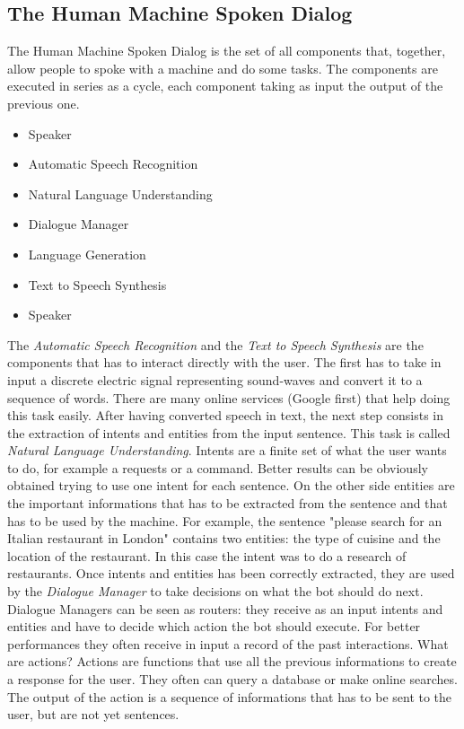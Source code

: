 \documentclass[11pt,a4paper]{article}
\begin{document}
\subsection{The Human Machine Spoken Dialog}

The Human Machine Spoken Dialog is the set of all components that, together, allow people to spoke with a machine and do some tasks. The components are executed in series as a cycle, each component taking as input the output of the previous one.
\begin{itemize}
\item Speaker
\item Automatic Speech Recognition
\item Natural Language Understanding
\item Dialogue Manager
\item Language Generation
\item Text to Speech Synthesis
\item Speaker
\end{itemize}
The \textit{Automatic Speech Recognition} and the \textit{Text to Speech Synthesis} are the components that has to interact directly with the user. The first has to take in input a discrete electric signal representing sound-waves and convert it to a sequence of words. There are many online services (Google first) that help doing this task easily.
After having converted speech in text, the next step consists in the extraction of intents and entities from the input sentence. This task is called \textit{Natural Language Understanding}. Intents are a finite set of what the user wants to do, for example a requests or a command. Better results can be obviously obtained trying to use one intent for each sentence. On the other side entities are the important informations that has to be extracted from the sentence and that has to be used by the machine. For example, the sentence "please search for an Italian restaurant in London" contains two entities: the type of cuisine and the location of the restaurant. In this case the intent was to do a research of restaurants.
Once intents and entities has been correctly extracted, they are used by the \textit{Dialogue Manager} to take decisions on what the bot should do next. Dialogue Managers can be seen as routers: they receive as an input intents and entities and have to decide which action the bot should execute. For better performances they often receive in input a record of the past interactions. What are actions? Actions are functions that use all the previous informations to create a response for the user. They often can query a database or make online searches. The output of the action is a sequence of informations that has to be sent to the user, but are not yet sentences.
\end{document}
